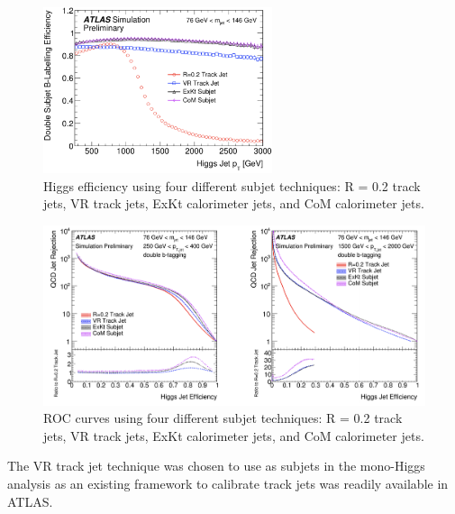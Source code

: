 \begin{figure}[htbp]
 \begin{center}
  \includegraphics[width=0.6\textwidth]{chapters/c5/figures/higgs_pt}

 \end{center}
 \caption{Higgs efficiency using four different subjet techniques: R = 0.2 track jets, VR track jets, ExKt calorimeter jets, and CoM calorimeter jets.}
 \label{fig:higgs_pt}
\end{figure}

\begin{figure}[htbp]
 \begin{center}
  \includegraphics[width=1\textwidth]{chapters/c5/figures/higgs_ROC}

 \end{center}
 \caption{ROC curves using four different subjet techniques: R = 0.2 track jets, VR track jets, ExKt calorimeter jets, and CoM calorimeter jets.}
 \label{fig:higgs_ROC}
\end{figure}
\par The VR track jet technique was chosen to use as subjets in the mono-Higgs analysis as an existing framework to calibrate track jets was readily available in ATLAS.












